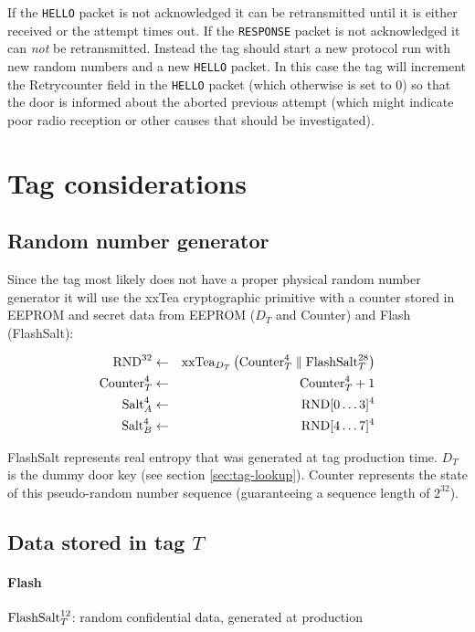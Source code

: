 \documentclass[a4paper,10pt]{scrartcl}
\begin{document}
If the \texttt{HELLO} packet is not acknowledged it can be retransmitted until it is either received or the attempt times out. If the \texttt{RESPONSE} packet is not acknowledged it can \emph{not} be retransmitted. Instead the tag should start a new protocol run with new random numbers and a new \texttt{HELLO} packet. In this case the tag will increment the Retrycounter field in the \texttt{HELLO} packet (which otherwise is set to $0$) so that the door is informed about the aborted previous attempt (which might indicate poor radio reception or other causes that should be investigated).

\section{Tag considerations}
\subsection{Random number generator} \label{sec:tag-rng}
Since the tag most likely does not have a proper physical random number generator it will use the xxTea cryptographic primitive with a counter stored in EEPROM and secret data from EEPROM ($D_T$ and Counter) and Flash (FlashSalt):

\begin{eqnarray*}
\textnormal{RND}^{32} &\leftarrow& \textnormal{xxTea}_{D_T}\left(\textnormal{Counter}_T^{4} \parallel \textnormal{FlashSalt}_T^{28} \right) \\
\textnormal{Counter}_T^{4} &\leftarrow& \textnormal{Counter}_T^{4} + 1 \\
\textnormal{Salt}_A^{4} &\leftarrow& \textnormal{RND}[0\ldots3]^{4} \\
\textnormal{Salt}_B^{4} &\leftarrow& \textnormal{RND}[4\ldots7]^{4} \\
\end{eqnarray*}

FlashSalt represents real entropy that was generated at tag production time. $D_T$ is the dummy door key (see section \ref{sec:tag-lookup}). Counter represents the state of this pseudo-random number sequence (guaranteeing a sequence length of $2^{32}$).

\subsection{Data stored in tag $T$}
\paragraph{Flash} $\textnormal{FlashSalt}_T^{12}$: random confidential data, generated at production
\end{document}
